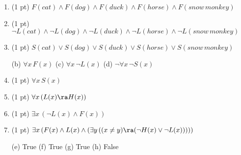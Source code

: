 \begin{questions}
\begin{enumerate}[label=(\alph*)]
  \vspace{-10pt}
  \item (1 pt)  \hspace*{0.15in}$F(cat) \wedge F(dog) \wedge F(duck) \wedge F(horse) \wedge F(snow\, monkey)$
  \item (1 pt)  \hspace*{0.15in}$\neg L(cat) \wedge \neg L(dog) \wedge \neg L(duck) \wedge \neg L(horse) \wedge \neg L(snow\, monkey) $
  \item (1 pt)  \hspace*{0.15in}$S(cat) \vee S(dog) \vee S(duck) \vee S(horse) \vee S(snow\, monkey)$
      \begin{solution}
        (b) $\forall x\, F(x)$
        \hspace*{0.5in} (c) $\forall x\, \neg L(x)$
        \hspace*{0.5in} (d) $\neg \forall x\, \neg S(x)$ 
      \end{solution}

  \vspace{-10pt}
  \item (1 pt) \hspace*{0.15in}  $\forall x\, S(x)$ 
  \item (1 pt) \hspace*{0.15in} $\forall x\, (L(x) \ra H(x))$
  \item (1 pt) \hspace*{0.15in} $\exists x\, (\neg L(x) \wedge F(x)) $
  \item (1 pt) \hspace*{0.15in} $\exists x\, (F(x) \wedge L(x) \wedge (\exists y\, ((x \neq y)  \ra (\neg H(x) \vee \neg L(x)))))$
    \begin{solution}
      (e) True 
      \hspace*{0.15in} (f) True 
      \hspace*{0.15in} (g) True
      \hspace*{0.15in} (h) False
    \end{solution}


\end{enumerate}
\end{questions}
